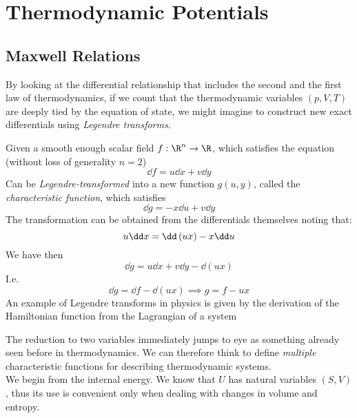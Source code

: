 \documentclass[../qm.tex]{subfiles}
\begin{document}
\chapter{Thermodynamic Potentials}
\section{Maxwell Relations}
By looking at the differential relationship that includes the second and the first law of thermodynamics, if we count that the thermodynamic variables $(p, V, T)$ are deeply tied by the equation of state, we might imagine to construct new exact differentials using \textit{Legendre transforms}.\\
\begin{dfn}
	Given a smooth enough scalar field $f:\R^n\to\R$, which satisfies the equation (without loss of generality $n=2$)
	\begin{equation*}
		\dd f=u\dd x+v\dd y
	\end{equation*}
	Can be \emph{Legendre-transformed} into a new function $g(u, y)$, called the \emph{characteristic function}, which satisfies
	\begin{equation*}
		\dd g=-x\dd u+v\dd y
	\end{equation*}
	The transformation can be obtained from the differentials themselves noting that:
	\begin{equation*}
		u\dd x=\dd\left( ux \right)-x\dd u\\
	\end{equation*}
	We have then
	\begin{equation*}
		\dd g=u\dd x+v\dd y-\dd\left( ux \right)
	\end{equation*}
	I.e.
	\begin{equation}
		\dd g=\dd f-\dd\left( ux \right)\implies g=f-ux
		\label{eq:legtrans.pot}
	\end{equation}
	An example of Legendre transforms in physics is given by the derivation of the Hamiltonian function from the Lagrangian of a system
\end{dfn}
The reduction to two variables immediately jumps to eye as something already seen before in thermodynamics. We can therefore think to define \textit{multiple} characteristic functions for describing thermodynamic systems.\\
We begin from the internal energy. We know that $U$ has natural variables $\left( S, V \right)$, thus its use is convenient only when dealing with changes in volume and entropy.\\
\end{document}

